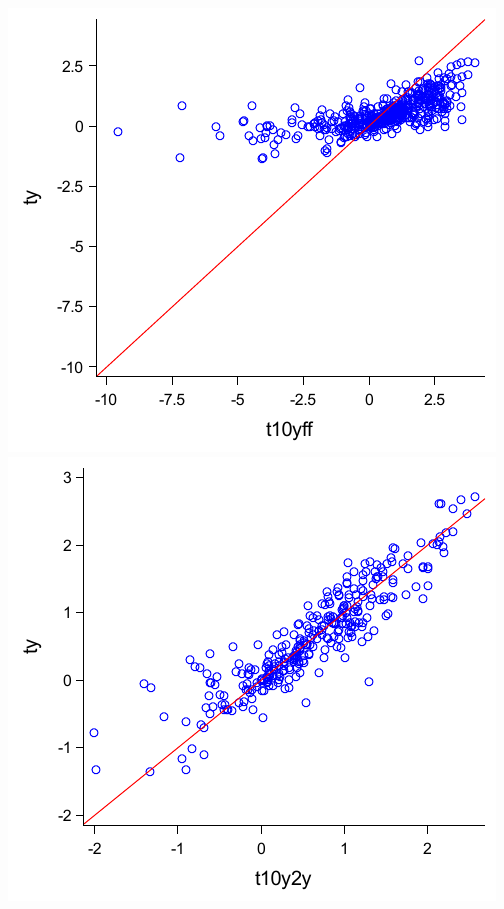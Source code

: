 \documentclass{article}
\begin{document}
\noindent
\includegraphics{scatter/t10yff}\includegraphics{scatter/t10y2y}\\
\end{document}
